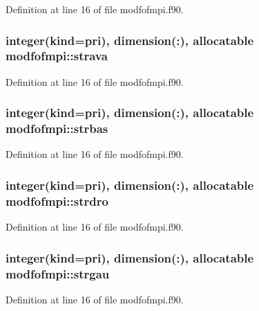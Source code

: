 Definition at line 16 of file modfofmpi.\-f90.

\hypertarget{classmodfofmpi_a2cc07767e1b2a2462fc2eeaaef5f5b0a}{
\subsubsection[{strava}]{\setlength{\rightskip}{0pt plus 5cm}integer(kind=pri), dimension(\-:), allocatable modfofmpi\-::strava}}\label{classmodfofmpi_a2cc07767e1b2a2462fc2eeaaef5f5b0a}


Definition at line 16 of file modfofmpi.\-f90.

\hypertarget{classmodfofmpi_a18f63a61d3cf10a560030f18385646d6}{
\subsubsection[{strbas}]{\setlength{\rightskip}{0pt plus 5cm}integer(kind=pri), dimension(\-:), allocatable modfofmpi\-::strbas}}\label{classmodfofmpi_a18f63a61d3cf10a560030f18385646d6}


Definition at line 16 of file modfofmpi.\-f90.

\hypertarget{classmodfofmpi_a6f52fb3f19368ce1dbad562162f6d4b5}{
\subsubsection[{strdro}]{\setlength{\rightskip}{0pt plus 5cm}integer(kind=pri), dimension(\-:), allocatable modfofmpi\-::strdro}}\label{classmodfofmpi_a6f52fb3f19368ce1dbad562162f6d4b5}


Definition at line 16 of file modfofmpi.\-f90.

\hypertarget{classmodfofmpi_a59d3a040e03ea0312701cf16ded04071}{
\subsubsection[{strgau}]{\setlength{\rightskip}{0pt plus 5cm}integer(kind=pri), dimension(\-:), allocatable modfofmpi\-::strgau}}\label{classmodfofmpi_a59d3a040e03ea0312701cf16ded04071}


Definition at line 16 of file modfofmpi.\-f90.


